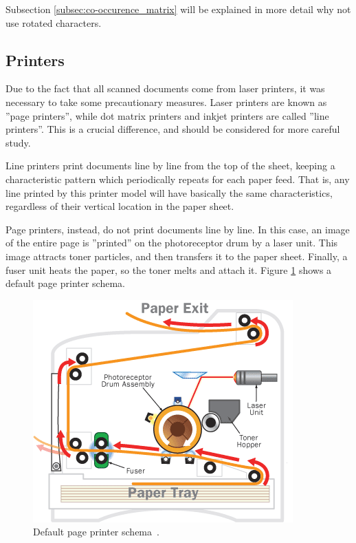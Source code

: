 \documentclass[10pt,twocolumn,letterpaper]{article}
\begin{document}
Subsection \ref{subsec:co-occurence_matrix} will be explained in more detail why not use rotated characters.

\subsection{Printers}
\label{subsec:printers}

Due to the fact that all scanned documents come from laser printers, it was necessary to take some precautionary measures. Laser printers are known as ''page printers'', while dot matrix printers and inkjet printers are called ''line printers''. This is a crucial difference, and should be considered for more careful study. 

Line printers print documents line by line from the top of the sheet, keeping a characteristic pattern which periodically repeats for each paper feed. That is, any line printed by this printer model will have basically the same characteristics, regardless of their vertical location in the paper sheet. 

Page printers, instead, do not print documents line by line. In this case, an image of the entire page is ''printed'' on the photoreceptor drum by a laser unit. This image attracts toner particles, and then transfers it to the paper sheet. Finally, a fuser unit heats the paper, so the toner melts and attach it. Figure \ref{fig:page_printer} shows a default page printer schema.

\begin{figure}
\begin{center}
	\includegraphics[width=0.99\columnwidth]{page_printer}
	\caption{Default page printer schema~\cite{Document_Analysis}.}
\label{fig:page_printer}   
\end{center} 
\end{figure}
\end{document}
